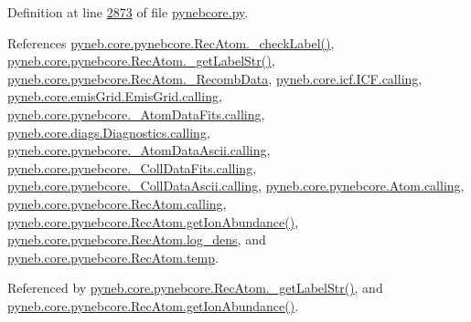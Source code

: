 Definition at line \hyperlink{pynebcore_8py_source_l02873}{2873} of file \hyperlink{pynebcore_8py_source}{pynebcore.\+py}.



References \hyperlink{pynebcore_8py_source_l02839}{pyneb.\+core.\+pynebcore.\+Rec\+Atom.\+\_\+check\+Label()}, \hyperlink{pynebcore_8py_source_l02854}{pyneb.\+core.\+pynebcore.\+Rec\+Atom.\+\_\+get\+Label\+Str()}, \hyperlink{pynebcore_8py_source_l02653}{pyneb.\+core.\+pynebcore.\+Rec\+Atom.\+\_\+\+Recomb\+Data}, \hyperlink{icf_8py_source_l00016}{pyneb.\+core.\+icf.\+I\+C\+F.\+calling}, \hyperlink{emis_grid_8py_source_l00041}{pyneb.\+core.\+emis\+Grid.\+Emis\+Grid.\+calling}, \hyperlink{pynebcore_8py_source_l00090}{pyneb.\+core.\+pynebcore.\+\_\+\+Atom\+Data\+Fits.\+calling}, \hyperlink{diags_8py_source_l00169}{pyneb.\+core.\+diags.\+Diagnostics.\+calling}, \hyperlink{pynebcore_8py_source_l00311}{pyneb.\+core.\+pynebcore.\+\_\+\+Atom\+Data\+Ascii.\+calling}, \hyperlink{pynebcore_8py_source_l00568}{pyneb.\+core.\+pynebcore.\+\_\+\+Coll\+Data\+Fits.\+calling}, \hyperlink{pynebcore_8py_source_l00918}{pyneb.\+core.\+pynebcore.\+\_\+\+Coll\+Data\+Ascii.\+calling}, \hyperlink{pynebcore_8py_source_l01175}{pyneb.\+core.\+pynebcore.\+Atom.\+calling}, \hyperlink{pynebcore_8py_source_l02572}{pyneb.\+core.\+pynebcore.\+Rec\+Atom.\+calling}, \hyperlink{pynebcore_8py_source_l02961}{pyneb.\+core.\+pynebcore.\+Rec\+Atom.\+get\+Ion\+Abundance()}, \hyperlink{pynebcore_8py_source_l02665}{pyneb.\+core.\+pynebcore.\+Rec\+Atom.\+log\+\_\+dens}, and \hyperlink{pynebcore_8py_source_l02661}{pyneb.\+core.\+pynebcore.\+Rec\+Atom.\+temp}.



Referenced by \hyperlink{pynebcore_8py_source_l02854}{pyneb.\+core.\+pynebcore.\+Rec\+Atom.\+\_\+get\+Label\+Str()}, and \hyperlink{pynebcore_8py_source_l02961}{pyneb.\+core.\+pynebcore.\+Rec\+Atom.\+get\+Ion\+Abundance()}.


